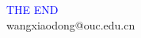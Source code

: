 \documentclass[hyperref={pdfpagelabels=false},compress,table]{beamer} %
\begin{document}
\begin{frame}
\centering
{\Huge \textcolor{blue}{THE END}} \\
\vspace{5mm}
{\Large wangxiaodong@ouc.edu.cn} \\
\end{frame}
\end{document}
